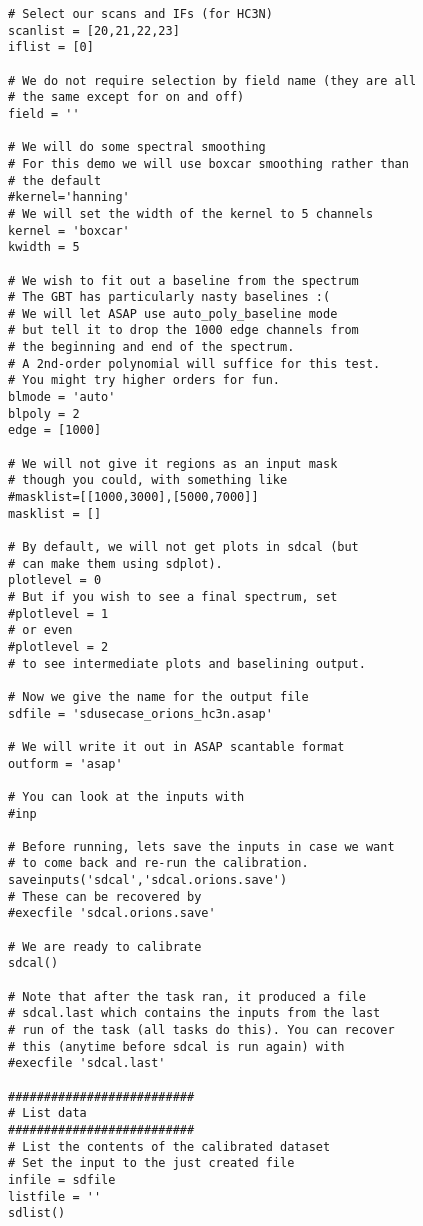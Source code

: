 \begin{verbatim}
# Select our scans and IFs (for HC3N)
scanlist = [20,21,22,23]
iflist = [0]

# We do not require selection by field name (they are all
# the same except for on and off)
field = ''

# We will do some spectral smoothing
# For this demo we will use boxcar smoothing rather than
# the default
#kernel='hanning'
# We will set the width of the kernel to 5 channels
kernel = 'boxcar'
kwidth = 5

# We wish to fit out a baseline from the spectrum
# The GBT has particularly nasty baselines :(
# We will let ASAP use auto_poly_baseline mode
# but tell it to drop the 1000 edge channels from
# the beginning and end of the spectrum.
# A 2nd-order polynomial will suffice for this test.
# You might try higher orders for fun.
blmode = 'auto'
blpoly = 2
edge = [1000]

# We will not give it regions as an input mask
# though you could, with something like
#masklist=[[1000,3000],[5000,7000]]
masklist = []

# By default, we will not get plots in sdcal (but
# can make them using sdplot).
plotlevel = 0
# But if you wish to see a final spectrum, set
#plotlevel = 1
# or even
#plotlevel = 2
# to see intermediate plots and baselining output.

# Now we give the name for the output file
sdfile = 'sdusecase_orions_hc3n.asap'

# We will write it out in ASAP scantable format
outform = 'asap'

# You can look at the inputs with
#inp

# Before running, lets save the inputs in case we want
# to come back and re-run the calibration.
saveinputs('sdcal','sdcal.orions.save')
# These can be recovered by
#execfile 'sdcal.orions.save'

# We are ready to calibrate
sdcal()

# Note that after the task ran, it produced a file
# sdcal.last which contains the inputs from the last
# run of the task (all tasks do this). You can recover
# this (anytime before sdcal is run again) with
#execfile 'sdcal.last'

##########################
# List data
##########################
# List the contents of the calibrated dataset
# Set the input to the just created file
infile = sdfile
listfile = ''
sdlist()


\end{verbatim}
